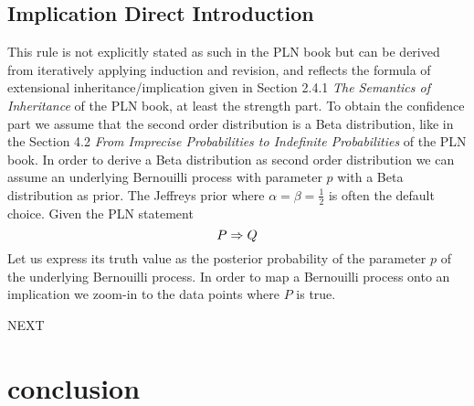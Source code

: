 \documentclass[]{article}
\begin{document}
\subsection{Implication Direct Introduction}
\label{sec:impldirect}
This rule is not explicitly stated as such in the PLN book but can be
derived from iteratively applying induction and revision, and reflects
the formula of extensional inheritance/implication given in Section
2.4.1 \emph{The Semantics of Inheritance} of the PLN book, at least
the strength part.  To obtain the confidence part we assume that the
second order distribution is a Beta distribution, like in the Section
4.2 \emph{From Imprecise Probabilities to Indefinite Probabilities} of
the PLN book.  In order to derive a Beta distribution as second order
distribution we can assume an underlying Bernouilli process with
parameter $p$ with a Beta distribution as prior.  The Jeffreys prior
where $\alpha=\beta=\frac{1}{2}$ is often the default choice.  Given
the PLN statement
$$P \Rightarrow Q$$ Let us express its truth value as the posterior
probability of the parameter $p$ of the underlying Bernouilli process.
In order to map a Bernouilli process onto an implication we zoom-in to
the data points where $P$ is true.

NEXT

\section{conclusion}



\end{document}
